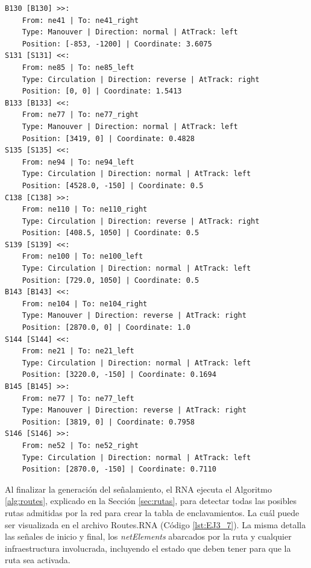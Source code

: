 \begin{lstlisting}[language = {}, tabsize=4, basicstyle=\footnotesize\ttfamily, showspaces=false, showstringspaces=false, caption = Signalling.RNA, label = {lst:EJ3_6}]
B130 [B130] >>:
	From: ne41 | To: ne41_right
	Type: Manouver | Direction: normal | AtTrack: left 
	Position: [-853, -1200] | Coordinate: 3.6075
S131 [S131] <<:
	From: ne85 | To: ne85_left
	Type: Circulation | Direction: reverse | AtTrack: right 
	Position: [0, 0] | Coordinate: 1.5413
B133 [B133] <<:
	From: ne77 | To: ne77_right
	Type: Manouver | Direction: normal | AtTrack: left 
	Position: [3419, 0] | Coordinate: 0.4828
S135 [S135] <<:
	From: ne94 | To: ne94_left
	Type: Circulation | Direction: normal | AtTrack: left 
	Position: [4528.0, -150] | Coordinate: 0.5
C138 [C138] >>:
	From: ne110 | To: ne110_right
	Type: Circulation | Direction: reverse | AtTrack: right 
	Position: [408.5, 1050] | Coordinate: 0.5
S139 [S139] <<:
	From: ne100 | To: ne100_left
	Type: Circulation | Direction: normal | AtTrack: left 
	Position: [729.0, 1050] | Coordinate: 0.5
B143 [B143] <<:
	From: ne104 | To: ne104_right
	Type: Manouver | Direction: reverse | AtTrack: right 
	Position: [2870.0, 0] | Coordinate: 1.0
S144 [S144] <<:
	From: ne21 | To: ne21_left
	Type: Circulation | Direction: normal | AtTrack: left 
	Position: [3220.0, -150] | Coordinate: 0.1694
B145 [B145] >>:
	From: ne77 | To: ne77_left
	Type: Manouver | Direction: reverse | AtTrack: right 
	Position: [3819, 0] | Coordinate: 0.7958
S146 [S146] >>:
	From: ne52 | To: ne52_right
	Type: Circulation | Direction: normal | AtTrack: left 
	Position: [2870.0, -150] | Coordinate: 0.7110
	\end{lstlisting}	

	Al finalizar la generación del señalamiento, el RNA ejecuta el Algoritmo \ref{alg:routes}, explicado en la Sección \ref{sec:rutas}, para detectar todas las posibles rutas admitidas por la red para crear la tabla de enclavamientos. La cuál puede ser visualizada en el archivo Routes.RNA (Código \ref{lst:EJ3_7}). La misma detalla las señales de inicio y final, los \textit{netElements} abarcados por la ruta y cualquier infraestructura involucrada, incluyendo el estado que deben tener para que la ruta sea activada.
	
